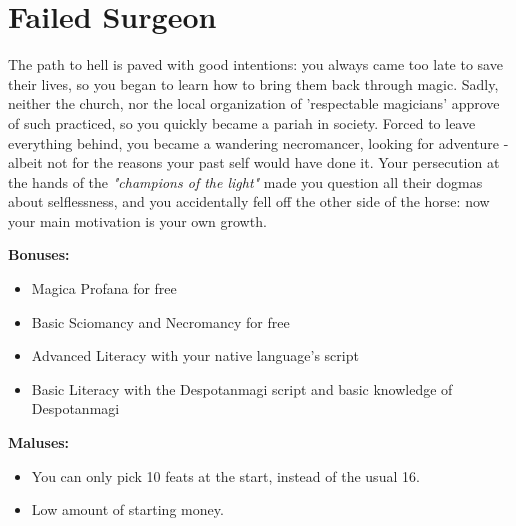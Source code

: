 \section{Failed Surgeon}
The path to hell is paved with good intentions: you always came too late to save their lives, so you began to learn how to bring them back through magic. Sadly, neither the church, nor the local organization of 'respectable magicians' approve of such practiced, so you quickly became a pariah in society. Forced to leave everything behind, you became a wandering necromancer, looking for adventure - albeit not for the reasons your past self would have done it. Your persecution at the hands of the \textit{"champions of the light"} made you question all their dogmas about selflessness, and you accidentally fell off the other side of the horse: now your main motivation is your own growth.


\textbf{Bonuses:}
\begin{itemize}
	\item Magica Profana for free
	\item Basic Sciomancy and Necromancy for free
	\item Advanced Literacy with your native language's script
	\item Basic Literacy with the Despotanmagi script and basic knowledge of Despotanmagi 
\end{itemize}


\textbf{Maluses:}
\begin{itemize}
	\item You can only pick 10 feats at the start, instead of the usual 16.
	\item Low amount of starting money.
\end{itemize}
